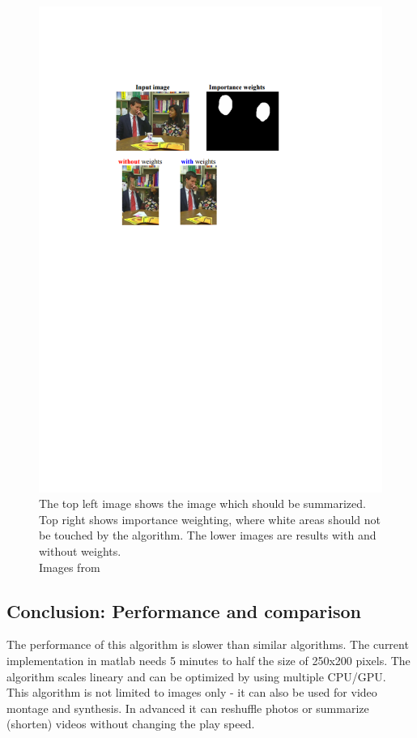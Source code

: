 \begin{figure}[h]
\centering
\includegraphics[scale=0.8]{img/importance_weights}
\caption[Importance weights]{The top left image shows the image which should be summarized. Top right shows importance weighting, where white areas should not be touched by the algorithm. The lower images are results with and without weights.\\ Images from \cite{bisi}}
\label{fig:Importance_weights}
\end{figure}

\subsection{Conclusion: Performance and comparison}
The performance of this algorithm is slower than similar algorithms. The current implementation in matlab needs 5 minutes to half the size of 250x200 pixels\footnotemark. The algorithm scales lineary and can be optimized by using multiple CPU/GPU. \cite{bisi}\\
This algorithm is not limited to images only - it can also be used for video montage and synthesis. In advanced it can reshuffle photos or summarize (shorten) videos without changing the play speed.

